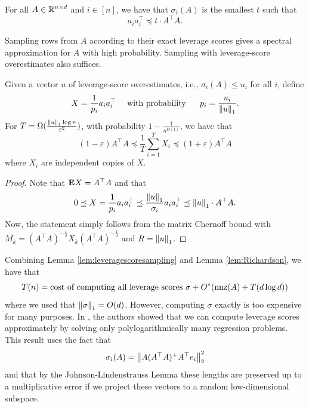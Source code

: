 \begin{lem}
\label{leverage_score_opt_2} For all $A\in\mathbb{R}^{n\times d}$ and $i\in[n]$,
we have that $\sigma_{i}(A)$ is the smallest $t$ such that 
\begin{equation}
a_{i}a^{\top}_{i}\preceq t\cdot A^{\top}A.\label{eq:leverage_score_spectral_upper}
\end{equation}
\end{lem}

Sampling rows from $A$ according to their exact leverage scores gives
a spectral approximation for $A$ with high probability. Sampling
with leverage-score overestimates also suffices.
\begin{lem}
\label{lem:leveragescoresampling}Given a vector $u$ of leverage-score
overestimates, i.e., $\sigma_{i}(A)\le u_{i}$ for all $i$, define
\[
X=\frac{1}{p_{i}}a_{i}a^{\top}_{i}\quad\mbox{ with probability \quad\ }p_{i}=\frac{u_{i}}{\left\Vert u\right\Vert_{1}}.
\]
For $T=\Omega(\frac{\left\Vert u\right\Vert_{1}\log n}{\varepsilon^{2}})$, with probability
$1-\frac{1}{n^{O(1)}}$, we have that
\[
(1-\varepsilon)A^{\top}A\preceq\frac{1}{T}\sum^{T}_{i=1}X_{i}\preceq(1+\varepsilon)A^{\top}A
\]
where $X_{i}$ are independent copies of $X$.
\end{lem}

\begin{proof}
Note that $\mathbf{E} X=A^{\top}A$ and that 
\[
0\preceq X=\frac{1}{p_{i}}a_{i}a^{\top}_{i}\preceq\frac{\left\Vert u\right\Vert_{1}}{\sigma_{i}}a_{i}a^{\top}_{i}\preceq\left\Vert u\right\Vert_{1}\cdot A^{\top}A.
\]
Now, the statement simply follows from the matrix Chernoff bound with
$M_{k}=(A^{\top}A)^{-\frac{1}{2}}X_{k}(A^{\top}A)^{-\frac{1}{2}}$
and $R=\left\Vert u\right\Vert_{1}$.
\end{proof}
Combining Lemma \ref{lem:leveragescoresampling} and Lemma \ref{lem:Richardson},
we have that
\begin{equation}
T(n)=\text{cost of computing all leverage scores }\sigma+O^{*}(\mathrm{nnz}(A)+T(d\log d))\label{eq:TmnS1}
\end{equation}
where we used that $\left\Vert \sigma\right\Vert_{1}=O(d)$. However, computing $\sigma$
exactly is too expensive for many purposes. In \cite{spielman2011graph},
the authors showed that we can compute leverage scores approximately
by solving only polylogarithmically many regression problems. This
result uses the fact that 
\[
\sigma_{i}(A)=\left\Vert A(A^{\top}A)^{+}A^{\top}e_{i}\right\Vert^{2}_{2}
\]
and that by the Johnson-Lindenstrauss Lemma these lengths are preserved
up to a multiplicative error if we project these vectors to a random
low-dimensional subspace.

